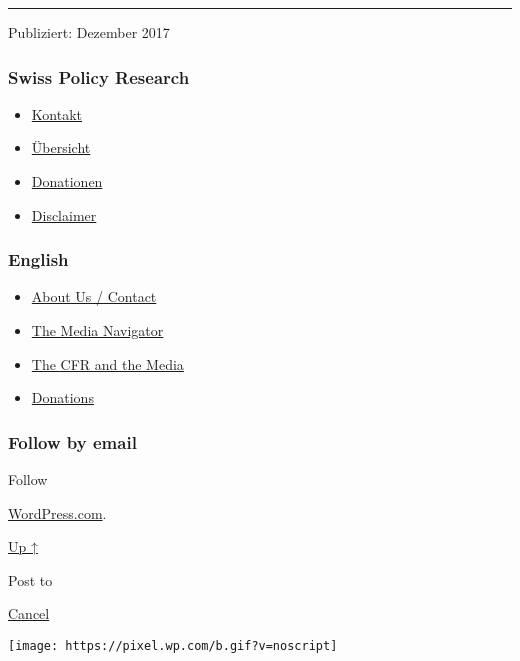 \begin{center}\rule{0.5\linewidth}{\linethickness}\end{center}

Publiziert: Dezember 2017

\hypertarget{swiss-policy-research}{%
\subsubsection{Swiss Policy Research}\label{swiss-policy-research}}

\begin{itemize}
\tightlist
\item
  \href{https://swprs.org/kontakt/}{Kontakt}
\item
  \href{https://swprs.org/uebersicht/}{Übersicht}
\item
  \href{https://swprs.org/donationen/}{Donationen}
\item
  \href{https://swprs.org/disclaimer/}{Disclaimer}
\end{itemize}

\hypertarget{english}{%
\subsubsection{English}\label{english}}

\begin{itemize}
\tightlist
\item
  \href{https://swprs.org/contact/}{About Us / Contact}
\item
  \href{https://swprs.org/media-navigator/}{The Media Navigator}
\item
  \href{https://swprs.org/the-american-empire-and-its-media/}{The CFR
  and the Media}
\item
  \href{https://swprs.org/donations/}{Donations}
\end{itemize}

\hypertarget{follow-by-email}{%
\subsubsection{Follow by email}\label{follow-by-email}}

Follow

\href{https://wordpress.com/?ref=footer_custom_com}{WordPress.com}.

\protect\hyperlink{}{Up ↑}

Post to

\protect\hyperlink{}{Cancel}

\texttt{[image: https://pixel.wp.com/b.gif?v=noscript]}
